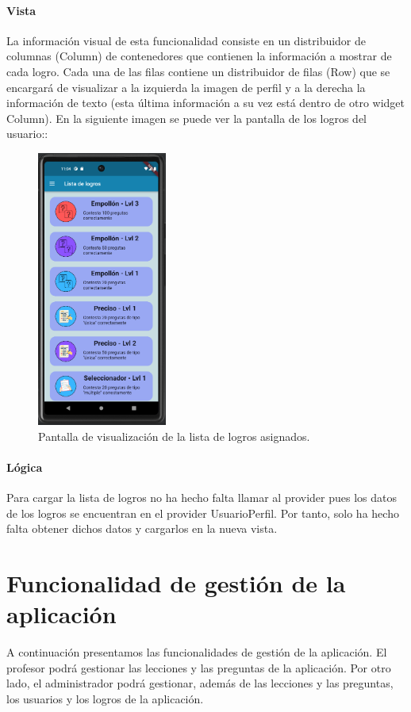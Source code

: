 \paragraph*{Vista}
La información visual de esta funcionalidad consiste en un distribuidor de columnas (Column) de contenedores que contienen la información a mostrar de cada logro. 
Cada una de las filas contiene un distribuidor de filas (Row) que se encargará de visualizar a la izquierda la imagen de perfil y
 a la derecha la información de texto (esta última información a su vez está dentro de otro widget Column). 
 En la siguiente imagen se puede ver la pantalla de los logros del usuario:: 


\begin{figure}[H]
  \centering
  \includegraphics[width=0.38\textwidth]{imagenes/c7/listalogrosperfil.png}
  \caption{Pantalla de visualización de la lista de logros asignados.} 
  \label{fig:ver_logros_perfil}
\end{figure}



\paragraph*{Lógica}
Para cargar la lista de logros no ha hecho falta llamar al provider pues los datos de los logros se encuentran en el provider UsuarioPerfil.
Por tanto, solo ha hecho falta obtener dichos datos y cargarlos en la nueva vista.

\newpage

\section{Funcionalidad de gestión de la aplicación}
A continuación presentamos las funcionalidades de gestión de la aplicación. 
El profesor podrá gestionar las lecciones y las preguntas de la aplicación. 
Por otro lado, el administrador podrá gestionar, además de las lecciones y las preguntas, los usuarios y los logros de la aplicación.

